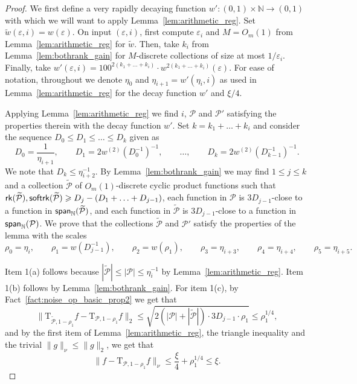 \documentclass[11pt]{article}
\newcommand\card[1]{\left| {#1} \right|}
\newcommand\norm[1]{\| #1 \|}
\newcommand\spn{{\sf span}_{\mathbb{N}}}
\newcommand\eps{\varepsilon}
\renewcommand\geq{\geqslant}
\renewcommand\leq{\leqslant}
\begin{document}
\begin{proof}
     We first define a very rapidly decaying function $w'\colon (0,1)\times\mathbb{N}\to (0,1)$ with which we will want to apply Lemma~\ref{lem:arithmetic_reg}.
    Set $\tilde{w}(\eps,i) = w(\eps)$. On input $(\eps,i)$, first compute $\eps_i$ and $M = O_{m}(1)$ from Lemma~\ref{lem:arithmetic_reg} for $\tilde{w}$. 
    Then, take $k_i$ from Lemma~\ref{lem:bothrank_gain} for $M$-discrete collections of size at most $1/\eps_i$. Finally, take $w'(\eps,i) = 100^{2(k_1+\ldots+k_i)}\cdot w^{2(k_1+\ldots+k_i)}(\eps)$. For ease of notation,  throughout we denote $\eta_0$ and $\eta_{i+1} = w'(\eta_i,i)$ as used in Lemma~\ref{lem:arithmetic_reg} for the decay function $w'$ and $\xi/4$.
    
    Applying Lemma~\ref{lem:arithmetic_reg} we find $i$, $\mathcal{P}$ and $\mathcal{P}'$ satisfying the properties therein with the decay function $w'$. Set $k=k_1+\ldots+k_i$ and consider the sequence 
    $D_0 \leq D_1 \leq \ldots\leq D_k$ given as 
    \[
    D_0 = \frac{1}{\eta_{i+1}},
    \qquad
    D_1 = 2w^{(2)}(D_0^{-1})^{-1},
    \qquad
    \ldots,
    \qquad
    D_{k} = 2w^{(2)}(D_{k-1}^{-1})^{-1}.
    \]
    We note that $D_{k}\leq \eta_{i+2}^{-1}$.
    By Lemma~\ref{lem:bothrank_gain} we may find $1\leq j\leq k$ and a collection $\widetilde{\mathcal{P}}$ of $O_{m}(1)$-discrete cyclic product functions such that
    ${\sf rk}(\widetilde{\mathcal{P}}),{\sf softrk}(\widetilde{\mathcal{P}})\geq D_{j}-(D_1+\ldots+D_{j-1})$, each function in $\mathcal{P}$ is $3D_{j-1}$-close to a function in $\spn(\widetilde{\mathcal{P}})$, and each function in $\widetilde{\mathcal{P}}$ 
    is $3D_{j-1}$-close to a function in $\spn(\mathcal{P})$. We prove that the collections $\widetilde{\mathcal{P}}$ and $\mathcal{P}'$ satisfy the properties of the lemma with the scales 
    \[
\rho_0=\eta_i,\qquad
\rho_1=w(D_{j-1}^{-1}),\qquad
\rho_2=w(\rho_1),\qquad
\rho_3=\eta_{i+3},\qquad
\rho_4=\eta_{i+4},\qquad
\rho_5=\eta_{i+5}.
\]
    
    
    Item 1(a) follows because 
    $|\widetilde{\mathcal{P}}|\leq \card{\mathcal{P}}\leq \eta_{i}^{-1}$ by Lemma~\ref{lem:arithmetic_reg}. Item 1(b) follows by Lemma~\ref{lem:bothrank_gain}.  For item 1(c), by Fact~\ref{fact:noise_op_basic_prop2} we get that
    \begin{equation}\label{eq:reg_with_rank}
    \norm{\mathrm{T}_{\widetilde{\mathcal{P}},1-\rho_1}f-\mathrm{T}_{\mathcal{P},1-\rho_1}f}_2
    \leq 
    \sqrt{2(\card{\mathcal{P}}+|\widetilde{\mathcal{P}}|)\cdot 3D_{j-1}\cdot \rho_1}
    \leq \rho_1^{1/4},
    \end{equation}
    and by the first item of Lemma~\ref{lem:arithmetic_reg}, the triangle inequality and the trivial $\|g\|_{\nu}\leq \norm{g}_2$, we get that
    \[
    \norm{f-\mathrm{T}_{\mathcal{P},1-\rho_1}f}_{\nu}\leq \frac{\xi}{4}+\rho_1^{1/4}
    \leq \xi.
    \]
    

\end{proof}
\end{document}
